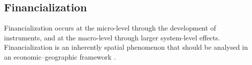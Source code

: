 \subsection{Financialization} 
Financialization occurs at the micro-level through the development of instruments, and at the macro-level through larger system-level effects. Financialization is an inherently spatial phenomenon that should be analysed in an economic–geographic framework \cite{aalbersPotentialFinancialization2015}.





